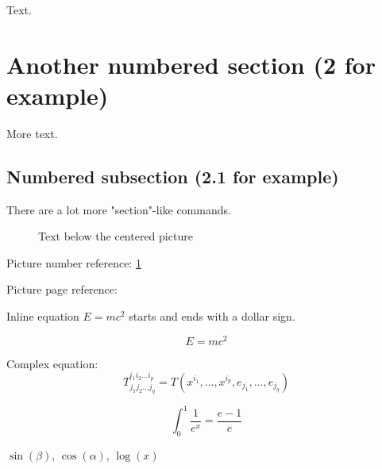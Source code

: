 \documentclass[12pt, a4paper]{article} %
\begin{document}
Text.

\section{Another numbered section (2 for example)}

More text.
 
\subsection{Numbered subsection (2.1 for example)}

There are a lot more "section"-like commands.



\setlength{\tabcolsep}{20pt} %
\renewcommand{\arraystretch}{1.5} %
\begin{figure}[H] %
    \centering
    \caption{Text below the centered picture}
    \label{fig:mozilla_picture_label}
\end{figure}
 
Picture number reference: \ref{fig:mozilla_picture_label}

Picture page reference: \pageref{fig:mozilla_picture_label} 



Inline equation $E=mc^2$ starts and ends with a dollar sign.

\begin{equation} %
E=mc^2
\end{equation}

Complex equation:
$$T^{i_1 i_2 \dots i_p}_{j_1 j_2 \dots j_q} = T(x^{i_1},\dots,x^{i_p},e_{j_1},\dots,e_{j_q})$$

$$\int_0^1 \frac{1}{e^x} =  \frac{e-1}{e}$$

$\sin(\beta)$, $\cos(\alpha)$, $\log(x)$
\end{document}
